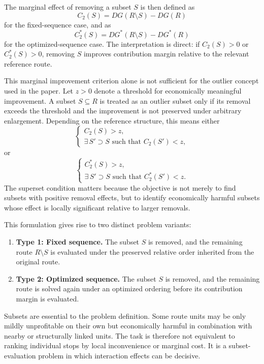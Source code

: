 \documentclass[preprint,12pt]{elsarticle}
\begin{document}
The marginal effect of removing a subset $S$ is then defined as
\[
C_2(S) = DG(R \setminus S) - DG(R)
\]
for the fixed-sequence case, and as
\[
C_2^*(S) = DG^*(R \setminus S) - DG^*(R)
\]
for the optimized-sequence case. The interpretation is direct: if $C_2(S) > 0$ or $C_2^*(S) > 0$, removing $S$ improves contribution margin relative to the relevant reference route.

This marginal improvement criterion alone is not sufficient for the outlier concept used in the paper. Let $z > 0$ denote a threshold for economically meaningful improvement. A subset $S \subseteq R$ is treated as an outlier subset only if its removal exceeds the threshold and the improvement is not preserved under arbitrary enlargement. Depending on the reference structure, this means either
\[
\begin{cases}
C_2(S) > z,\\
\exists\, S' \supset S \text{ such that } C_2(S') < z,
\end{cases}
\]
or
\[
\begin{cases}
C_2^*(S) > z,\\
\exists\, S' \supset S \text{ such that } C_2^*(S') < z.
\end{cases}
\]
The superset condition matters because the objective is not merely to find subsets with positive removal effects, but to identify economically harmful subsets whose effect is locally significant relative to larger removals.

This formulation gives rise to two distinct problem variants:
\begin{enumerate}[label=(\arabic*)]
\item \textbf{Type 1: Fixed sequence.} The subset $S$ is removed, and the remaining route $R \setminus S$ is evaluated under the preserved relative order inherited from the original route.
\item \textbf{Type 2: Optimized sequence.} The subset $S$ is removed, and the remaining route is solved again under an optimized ordering before its contribution margin is evaluated.
\end{enumerate}

Subsets are essential to the problem definition. Some route units may be only mildly unprofitable on their own but economically harmful in combination with nearby or structurally linked units. The task is therefore not equivalent to ranking individual stops by local inconvenience or marginal cost. It is a subset-evaluation problem in which interaction effects can be decisive.
\end{document}
